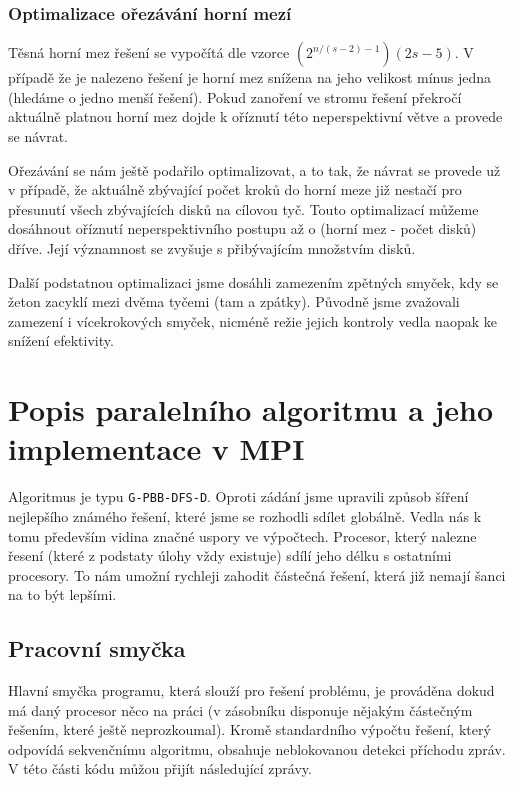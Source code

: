 \documentclass[12pt]{article}
\begin{document}
\subsubsection{Optimalizace ořezávání horní mezí}
Těsná horní mez řešení se vypočítá dle vzorce $(2^{n/(s-2)-1})(2s-5)$. V případě
že je nalezeno řešení je horní mez snížena na jeho velikost mínus jedna (hledáme
o jedno menší řešení). Pokud zanoření ve stromu řešení překročí aktuálně platnou
horní mez dojde k oříznutí této neperspektivní větve a provede se návrat. 

Ořezávání se nám ještě podařilo optimalizovat, a to tak, že návrat se provede už
v případě, že aktuálně zbývající počet kroků do horní meze již nestačí pro
přesunutí všech zbývajících disků na cílovou tyč. Touto optimalizací můžeme
dosáhnout oříznutí neperspektivního postupu až o (horní mez - počet disků)
dříve. Její významnost se zvyšuje s přibývajícím množstvím disků.

Další podstatnou optimalizaci jsme dosáhli zamezením zpětných smyček, kdy se
žeton zacyklí mezi dvěma tyčemi (tam a zpátky). Původně jsme zvažovali zamezení
i vícekrokových smyček, nicméně režie jejich kontroly vedla naopak ke
snížení efektivity.

\section{Popis paralelního algoritmu a jeho implementace v MPI}
Algoritmus je typu \verb|G-PBB-DFS-D|. Oproti zádání jsme upravili způsob
šíření nejlepšího známého řešení, které jsme se rozhodli sdílet globálně. Vedla
nás k tomu především vidina značné uspory ve výpočtech. Procesor, který nalezne
řesení (které z podstaty úlohy vždy existuje) sdílí jeho délku s ostatními
procesory. To nám umožní rychleji zahodit částečná řešení, která již
nemají šanci na to být lepšími.

\subsection{Pracovní smyčka}
Hlavní smyčka programu, která slouží pro řešení problému, je prováděna dokud má
daný procesor něco na práci (v zásobníku disponuje nějakým částečným řešením,
které ještě neprozkoumal). Kromě standardního výpočtu řešení, který odpovídá
sekvenčnímu algoritmu, obsahuje neblokovanou detekci příchodu zpráv. V této
části kódu můžou přijít následující zprávy.
\end{document}
